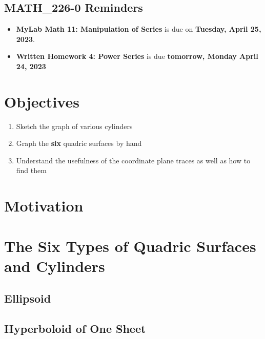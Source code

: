 \documentclass{report}
\begin{document}
\begin{sloppypar}
\begin{itemize}
\end{itemize}
\subsection{MATH\_226-0 Reminders}
\begin{itemize}
  \item \textbf{MyLab Math 11: Manipulation of Series}
        is due on \textbf{Tuesday, April 25, 2023}.
  \item \textbf{Written Homework 4: Power Series} is due
        \textbf{tomorrow, Monday April 24, 2023}
\end{itemize}

\section{Objectives}
\begin{enumerate}
  \item Sketch the graph of various cylinders
  \item Graph the \textbf{six} quadric surfaces by hand
  \item Understand the usefulness of the coordinate plane
        traces as well as how to find them

\end{enumerate}

\section{Motivation}

\section{The Six Types of Quadric Surfaces and Cylinders}
\subsection{Ellipsoid}
\subsection{Hyperboloid of One Sheet}

\end{sloppypar}
\end{document}

